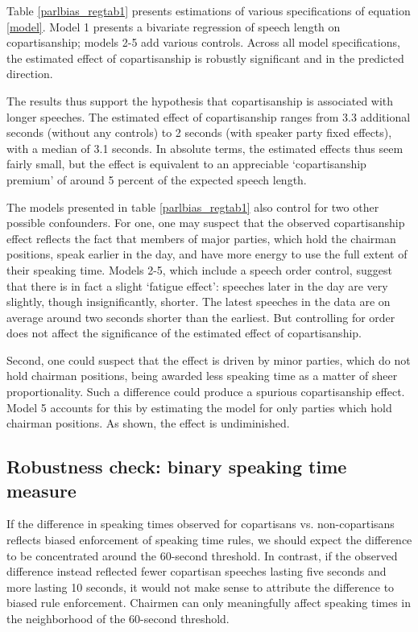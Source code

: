 \documentclass[12pt,a4paper]{article}
\begin{document}
Table \ref{parlbias_regtab1} presents estimations of various specifications of equation \ref{model}. Model 1 presents a bivariate regression of speech length on copartisanship; models 2-5 add various controls. Across all model specifications, the estimated effect of copartisanship is robustly significant and in the predicted direction. 



The results thus support the hypothesis that copartisanship is associated with longer speeches. The estimated effect of copartisanship ranges from 3.3 additional seconds (without any controls) to 2 seconds (with speaker party fixed effects), with a median of 3.1 seconds. In absolute terms, the estimated effects thus seem fairly small, but the effect is equivalent to an appreciable `copartisanship premium' of around 5 percent of the expected speech length.

The models presented in table \ref{parlbias_regtab1} also control for two other possible confounders. For one, one may suspect that the observed copartisanship effect reflects the fact that members of major parties, which hold the chairman positions, speak earlier in the day, and have more energy to use the full extent of their speaking time. Models 2-5, which include a speech order control, suggest that there is in fact a slight `fatigue effect': speeches later in the day are very slightly, though insignificantly, shorter. The latest speeches in the data are on average around two seconds shorter than the earliest. But controlling for order does not affect the significance of the estimated effect of copartisanship.

Second, one could suspect that the effect is driven by minor parties, which do not hold chairman positions, being awarded less speaking time as a matter of sheer proportionality. Such a difference could produce a spurious copartisanship effect. Model 5 accounts for this by estimating the model for only parties which hold chairman positions. As shown, the effect is undiminished.

\subsection{Robustness check: binary speaking time measure}

If the difference in speaking times observed for copartisans vs. non-copartisans reflects biased enforcement of speaking time rules, we should expect the difference to be concentrated around the 60-second threshold. In contrast, if the observed difference instead reflected fewer copartisan speeches lasting five seconds and more lasting 10 seconds, it would not make sense to attribute the difference to biased rule enforcement. Chairmen can only meaningfully affect speaking times in the neighborhood of the 60-second threshold. 
\end{document}
